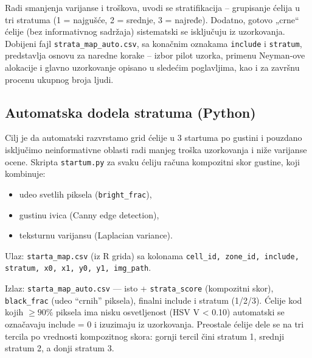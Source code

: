 \documentclass[a4paper,12pt]{article}
\begin{document}
Radi smanjenja varijanse i troškova, uvodi se stratifikacija – grupisanje ćelija u tri stratuma (1 = najgušće, 2 = srednje, 3 = najređe).
Dodatno, gotovo „crne“ ćelije (bez informativnog sadržaja) sistematski se isključuju iz uzorkovanja.
\noindent
Dobijeni fajl \texttt{strata\_map\_auto.csv}, sa konačnim oznakama \texttt{include} i \texttt{stratum}, predstavlja osnovu za naredne korake – izbor pilot uzorka, primenu Neyman-ove alokacije i glavno uzorkovanje opisano u sledećim poglavljima, kao i za završnu procenu ukupnog broja ljudi.


\subsection{Automatska dodela stratuma (Python)}

Cilj je da automatski razvrstamo grid ćelije u 3 startuma po gustini i pouzdano isključimo neinformativne oblasti radi manjeg troška uzorkovanja i niže varijanse ocene.
Skripta \texttt{startum.py} za svaku ćeliju računa kompozitni skor gustine, koji kombinuje:
\begin{itemize}
    \item udeo svetlih piksela (\texttt{bright\_frac}),
    \item gustinu ivica (Canny edge detection),
    \item teksturnu varijansu (Laplacian variance).
\end{itemize}


\noindent Ulaz: \texttt{starta\_map.csv} (iz R grida) sa kolonama
\texttt{cell\_id, zone\_id, include, stratum, x0, x1, y0, y1, img\_path}.

\noindent Izlaz: \texttt{starta\_map\_auto.csv} — isto +
\texttt{strata\_score} (kompozitni skor), \texttt{black\_frac} (udeo “crnih” piksela), finalni include i stratum (1/2/3).
\newline
\newline
\noindent Ćelije kod kojih $ \ge 90\% $ piksela ima nisku osvetljenost (HSV V < 0.10) automatski se označavaju include = 0 i izuzimaju iz uzorkovanja. 
Preostale ćelije dele se na tri tercila po vrednosti kompozitnog skora: gornji tercil čini stratum 1, srednji stratum 2, a donji stratum 3.
\end{document}
